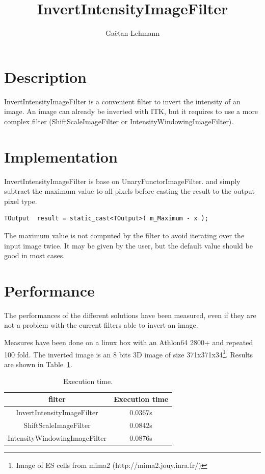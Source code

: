 \documentclass[IJ]{cesj}
\author{Ga\"etan Lehmann}
\institute{Biologie du d\'eveloppement et de la reproduction, INRA de Jouy-en-Josas}
\title{InvertIntensityImageFilter}
\begin{document}
\lstset{language=c++}
\maketitle

\section{Description}
InvertIntensityImageFilter is a convenient filter to invert the intensity of an image. An image can already be inverted with ITK, but it requires to use a more complex filter (ShiftScaleImageFilter or IntensityWindowingImageFilter).

\section{Implementation}
InvertIntensityImageFilter is base on UnaryFunctorImageFilter. and simply subtract the maximum value to all pixels before casting the result to the output pixel type.
\begin{lstlisting}
TOutput  result = static_cast<TOutput>( m_Maximum - x );
\end{lstlisting}
The maximum value is not computed by the filter to avoid iterating over the input image twice. It may be given by the user, but the default value should be good in most cases.
 
\section{Performance}
The performances of the different solutions have been measured, even if they are not a problem with the current filters able to invert an image. 

Measures have been done on a linux box with an Athlon64 2800+ and repeated 100 fold. The inverted image is an 8 bits 3D image of size 371x371x34\footnote{Image of ES cells from mima2 (http://mima2.jouy.inra.fr/)}. Results are shown in Table~\ref{perf}.

\begin{table}
\centering
\begin{tabular}{cc}
\hline
filter & Execution time \\
\hline
\hline
InvertIntensityImageFilter & 0.0367s \\
ShiftScaleImageFilter & 0.0842s \\
IntensityWindowingImageFilter & 0.0876s \\
\hline
\end{tabular}
\caption{Execution time.\label{perf}}
\end{table}
\end{document}
